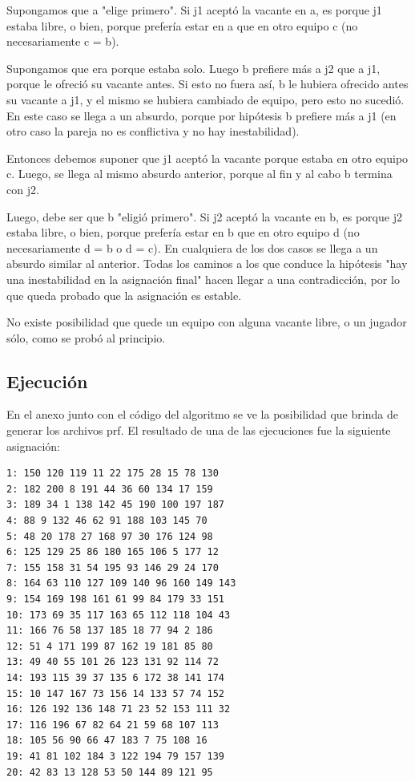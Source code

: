 \documentclass[article,a4paper]{article}
\begin{document}
Supongamos que a "elige primero". Si j1 aceptó la vacante en a, es porque j1 estaba libre, o bien, porque prefería estar en a que en otro equipo c (no necesariamente c = b).     

Supongamos que era porque estaba solo. Luego b prefiere más a j2 que a j1, porque le ofreció su vacante antes. Si esto no fuera así, b le hubiera ofrecido antes su vacante a j1, y el mismo se hubiera cambiado de equipo, pero esto no sucedió. En este caso se llega a un absurdo, porque por hipótesis b prefiere más a j1 (en otro caso la pareja no es conflictiva y no hay inestabilidad).

Entonces debemos suponer que j1 aceptó la vacante porque estaba en otro equipo c. Luego, se llega al mismo absurdo anterior, porque al fin y al cabo b termina con j2.

Luego, debe ser que b "eligió primero". Si j2 aceptó la vacante en b, es porque j2 estaba libre, o bien, porque prefería estar en b que en otro equipo d (no necesariamente d = b o d = c). En cualquiera de los dos casos se llega a un absurdo similar al anterior.
Todas los caminos a los que conduce la hipótesis "hay una inestabilidad en la asignación final" hacen llegar a una contradicción, por lo que queda probado que la asignación es estable.

No existe posibilidad que quede un equipo con alguna vacante libre, o un jugador sólo, como se probó al principio.

\subsection{Ejecución}
En el anexo junto con el código del algoritmo se ve la posibilidad que brinda de generar los archivos prf. El resultado de una de las ejecuciones fue la siguiente asignación: 

\begin{verbatim}
1: 150 120 119 11 22 175 28 15 78 130
2: 182 200 8 191 44 36 60 134 17 159
3: 189 34 1 138 142 45 190 100 197 187
4: 88 9 132 46 62 91 188 103 145 70
5: 48 20 178 27 168 97 30 176 124 98
6: 125 129 25 86 180 165 106 5 177 12
7: 155 158 31 54 195 93 146 29 24 170
8: 164 63 110 127 109 140 96 160 149 143
9: 154 169 198 161 61 99 84 179 33 151
10: 173 69 35 117 163 65 112 118 104 43
11: 166 76 58 137 185 18 77 94 2 186
12: 51 4 171 199 87 162 19 181 85 80
13: 49 40 55 101 26 123 131 92 114 72
14: 193 115 39 37 135 6 172 38 141 174
15: 10 147 167 73 156 14 133 57 74 152
16: 126 192 136 148 71 23 52 153 111 32
17: 116 196 67 82 64 21 59 68 107 113
18: 105 56 90 66 47 183 7 75 108 16
19: 41 81 102 184 3 122 194 79 157 139
20: 42 83 13 128 53 50 144 89 121 95
\end{verbatim}
\end{document}
